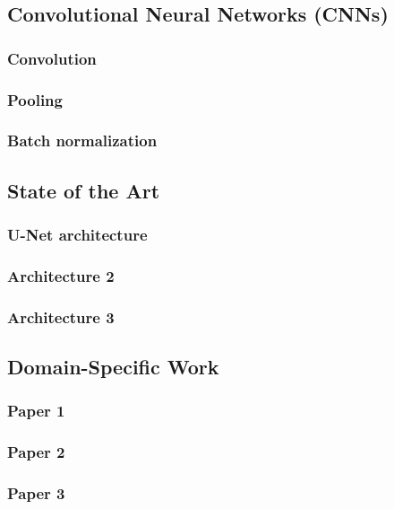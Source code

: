 \subsection{Convolutional Neural Networks (CNNs)}
\label{sec:cnn}
  \subsubsection{Convolution}
  \subsubsection{Pooling}
  \subsubsection{Batch normalization}

\subsection{State of the Art}
\label{sec:cnn-architectures}
  \subsubsection{U-Net architecture}
  \subsubsection{Architecture 2}
  \subsubsection{Architecture 3}

\subsection{Domain-Specific Work}
\label{sec:remote-sensing-research}
  \subsubsection{Paper 1}
  \subsubsection{Paper 2}
  \subsubsection{Paper 3}
